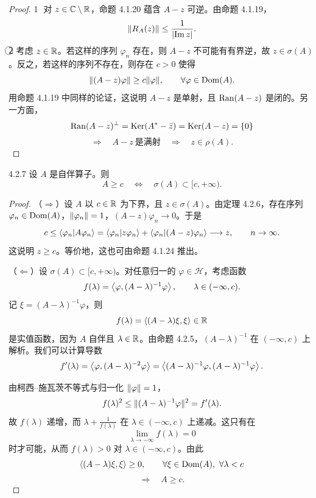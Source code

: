 \begin{proof}
  \textcircled{\small 1} 对 $z\in\mathbb{C}\setminus\mathbb{R}$，命题 4.1.20 蕴含 $A-z$ 可逆。由命题 4.1.19，
  \[
  \lVert R_A(z)\rVert\le\frac{1}{\lvert \operatorname{Im} z\rvert}.
  \]
  \textcircled{\small 2} 考虑 $z\in\mathbb{R}$。若这样的序列 $\varphi_n$ 存在，则 $A-z$ 不可能有有界逆，故 $z\in\sigma(A)$。反之，若这样的序列不存在，则存在 $c>0$ 使得
  \[
  \lVert (A-z)\varphi\rVert\ge c\lVert \varphi\rVert,\qquad\forall\varphi\in\operatorname{Dom}(A).
  \]
  用命题 4.1.19 中同样的论证，这说明 $A-z$ 是单射，且 $\operatorname{Ran}(A-z)$ 是闭的。另一方面，
  \[
  \operatorname{Ran}(A-z)^\perp=\operatorname{Ker}(A^*-\bar z)=\operatorname{Ker}(A-z)=\{0\}
  \]
  \[
  \Longrightarrow\quad A-z\ \text{是满射}
  \quad\Longrightarrow\quad z\in\rho(A).
  \]
\end{proof}

\begin{proposition}{4.2.7}
  设 $A$ 是自伴算子。则
  \[
  A\ge c\quad\Longleftrightarrow\quad\sigma(A)\subset[c,+\infty).
  \]
\end{proposition}

\begin{proof}
  （$\Rightarrow$）设 $A$ 以 $c\in\mathbb{R}$ 为下界，且 $z\in\sigma(A)$。由定理 4.2.6，存在序列 $\varphi_n\in\operatorname{Dom}(A)$，$\lVert \varphi_n\rVert=1$，$(A-z)\varphi_n\to 0$。于是
  \[
  c\le\langle \varphi_n|A\varphi_n\rangle
  =\langle \varphi_n|z\varphi_n\rangle+\langle \varphi_n|(A-z)\varphi_n\rangle
  \longrightarrow z,\qquad n\to\infty.
  \]
  这说明 $z\ge c$。等价地，这也可由命题 4.1.24 推出。

  （$\Leftarrow$）设 $\sigma(A)\subset[c,+\infty)$。对任意归一的 $\varphi\in\mathcal{H}$，考虑函数
  \[
  f(\lambda)=\left\langle \varphi,(A-\lambda)^{-1}\varphi\right\rangle,\qquad\lambda\in(-\infty,c).
  \]
  记 $\xi=(A-\lambda)^{-1}\varphi$，则
  \[
  f(\lambda)=\left\langle (A-\lambda)\xi,\xi\right\rangle\in\mathbb{R}
  \]
  是实值函数，因为 $A$ 自伴且 $\lambda\in\mathbb{R}$。由命题 4.2.5，$(A-\lambda)^{-1}$ 在 $(-\infty,c)$ 上解析。我们可以计算导数
  \[
  f'(\lambda)=\left\langle \varphi,(A-\lambda)^{-2}\varphi\right\rangle
  =\left\langle (A-\lambda)^{-1}\varphi,(A-\lambda)^{-1}\varphi\right\rangle.
  \]

  由柯西–施瓦茨不等式与归一化 $\lVert \varphi\rVert=1$，
  \[
  f(\lambda)^2\le\lVert (A-\lambda)^{-1}\varphi\rVert^2=f'(\lambda).
  \]
  故 $f(\lambda)$ 递增，而 $\lambda+\frac{1}{f(\lambda)}$ 在 $\lambda\in(-\infty,c)$ 上递减。这只有在
  \[
  \lim_{\lambda\to-\infty}f(\lambda)=0
  \]
  时才可能，从而 $f(\lambda)>0$ 对 $\lambda\in(-\infty,c)$。由此
  \[
  \left\langle (A-\lambda)\xi,\xi\right\rangle\ge 0,\qquad\forall\xi\in\operatorname{Dom}(A),\ \forall\lambda<c
  \]
  \[
  \Longrightarrow\quad A\ge c.
  \]
\end{proof}

